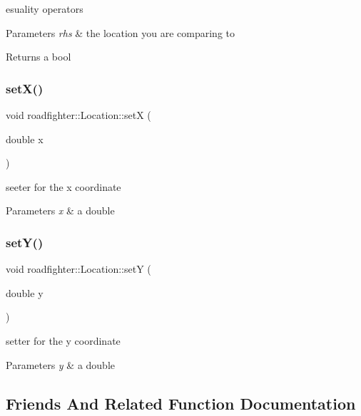 esuality operators 
\begin{DoxyParams}{Parameters}
{\em rhs} & the location you are comparing to \\
\hline
\end{DoxyParams}
\begin{DoxyReturn}{Returns}
a bool 
\end{DoxyReturn}
\mbox{\label{classroadfighter_1_1Location_ac58576927a3841e2ac0f3a14238be14f}} 
\subsubsection{\texorpdfstring{set\+X()}{setX()}}
{\footnotesize\ttfamily void roadfighter\+::\+Location\+::setX (\begin{DoxyParamCaption}\item[{double}]{x }\end{DoxyParamCaption})}

seeter for the x coordinate 
\begin{DoxyParams}{Parameters}
{\em x} & a double \\
\hline
\end{DoxyParams}
\mbox{\label{classroadfighter_1_1Location_ace0dc3e91d430176c43ec88c2bc4677c}} 
\subsubsection{\texorpdfstring{set\+Y()}{setY()}}
{\footnotesize\ttfamily void roadfighter\+::\+Location\+::setY (\begin{DoxyParamCaption}\item[{double}]{y }\end{DoxyParamCaption})}

setter for the y coordinate 
\begin{DoxyParams}{Parameters}
{\em y} & a double \\
\hline
\end{DoxyParams}


\subsection{Friends And Related Function Documentation}
\mbox{\label{classroadfighter_1_1Location_aec4517a843218b97cd7d4d6fccc07449}} 
